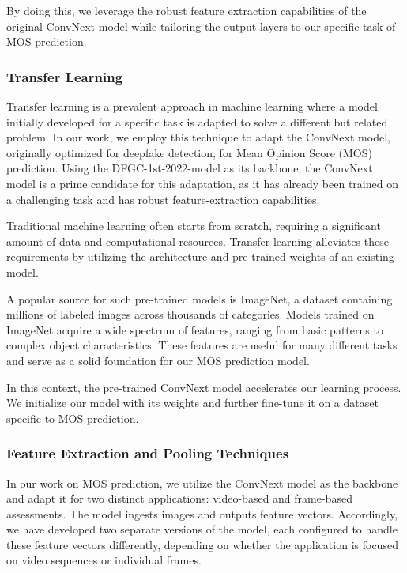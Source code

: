 \documentclass[a4paper,12pt,openright]{book}
\begin{document}
By doing this, we leverage the robust feature extraction capabilities of the original ConvNext model while tailoring the output layers to our specific task of MOS prediction.

\subsubsection{Transfer Learning}

Transfer learning is a prevalent approach in machine learning where a model initially developed for a specific task is adapted to solve a different but related problem. In our work, we employ this technique to adapt the ConvNext model, originally optimized for deepfake detection, for Mean Opinion Score (MOS) prediction. Using the DFGC-1st-2022-model as its backbone, the ConvNext model is a prime candidate for this adaptation, as it has already been trained on a challenging task and has robust feature-extraction capabilities.

Traditional machine learning often starts from scratch, requiring a significant amount of data and computational resources. Transfer learning alleviates these requirements by utilizing the architecture and pre-trained weights of an existing model.

A popular source for such pre-trained models is ImageNet, a dataset containing millions of labeled images across thousands of categories. Models trained on ImageNet acquire a wide spectrum of features, ranging from basic patterns to complex object characteristics. These features are useful for many different tasks and serve as a solid foundation for our MOS prediction model.

In this context, the pre-trained ConvNext model accelerates our learning process. We initialize our model with its weights and further fine-tune it on a dataset specific to MOS prediction. 

\subsubsection{Feature Extraction and Pooling Techniques}

In our work on MOS prediction, we utilize the ConvNext model as the backbone and adapt it for two distinct applications: video-based and frame-based assessments. The model ingests images and outputs feature vectors. Accordingly, we have developed two separate versions of the model, each configured to handle these feature vectors differently, depending on whether the application is focused on video sequences or individual frames.
\end{document}
